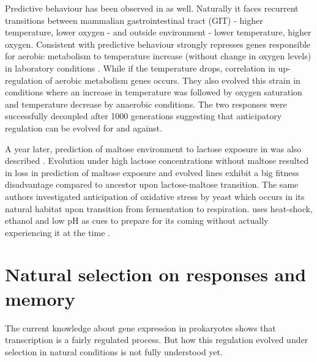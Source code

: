 Predictive behaviour has been observed in  as well.
Naturally it faces recurrent transitions between mammalian gastrointestinal tract (GIT) - higher temperature, lower oxygen - and outside environment - lower temperature, higher oxygen.
Consistent with predictive behaviour  strongly represses genes responsible for aerobic metabolism to temperature increase (without change in oxygen levels) in laboratory conditions \cite{tagkopoulos2008predictive}.
While if the temperature drops, correlation in up-regulation of aerobic metabolism genes occurs.
They also evolved this strain in conditions where an increase in temperature was followed by oxygen saturation and temperature decrease by anaerobic conditions.
The two responses were successfully decoupled after 1000 generations suggesting that anticipatory regulation can be evolved for and against.

A year later, prediction of maltose environment to lactose exposure in  was also described \cite{mitchell2009adaptive}.
Evolution under high lactose concentrations without maltose resulted in loss in prediction of maltose exposure and evolved lines exhibit a big fitness disadvantage compared to ancestor upon lactose-maltose transition.
The same authors investigated anticipation of oxidative stress by yeast which occurs in its natural habitat upon transition from fermentation to respiration.
 uses heat-shock, ethanol and low pH as cues to prepare for its coming without actually experiencing it at the time \cite{mitchell2009adaptive}.


\section{Natural selection on responses and memory}
The current knowledge about gene expression in prokaryotes shows that transcription is a fairly regulated process.
But how this regulation evolved under selection in natural conditions is not fully understood yet.

